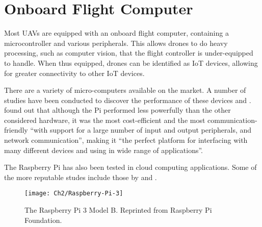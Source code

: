 \section{Onboard Flight Computer}
Most UAVs are equipped with an onboard flight computer, containing a microcontroller and various peripherals. This allows drones to do heavy processing, such as computer vision, that the flight controller is under-equipped to handle. When thus equipped, drones can be identified as IoT devices, allowing for greater connectivity to other IoT devices.

There are a variety of micro-computers available on the market. A number of studies have been conducted to discover the performance of these devices \cite{benchmark} and \cite{maksimovic2014raspberry}.  found out that although the Pi performed less powerfully than the other considered hardware, it was the most cost-efficient and the most communication-friendly ``with support for a large number of input and output peripherals, and network communication'', making it ``the perfect platform for interfacing with many different devices and using in wide range of applications''.

The Raspberry Pi has also been tested in cloud computing applications. Some of the more reputable studes include those by  and .

\begin{figure}[t]
	\centering\texttt{[image: Ch2/Raspberry-Pi-3]}
	\caption{The Raspberry Pi 3 Model B. Reprinted from Raspberry Pi Foundation.}
	\label{fig:pixhawk}
\end{figure}
\FloatBarrier





